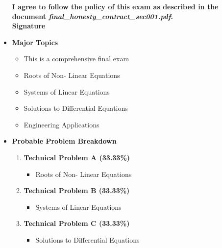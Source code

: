 \documentclass[11pt]{article}
\begin{document}
\begin{itemize}
\begin{itemize}
\end{itemize}
\begin{framed}
		 \textbf{\Large I \underline{\hspace{50mm}} agree to follow the policy of this exam as described in the document {\it final\_honesty\_contract\_sec001.pdf}.  }\vspace{3mm}\\
		 \textbf{\Large Signature \underline{\hspace{100mm} }}\\
\end{framed}
	
\newpage
\item  \textbf{\Large Major Topics}\\
	\begin{itemize}

		\item  {\large This is a comprehensive final exam}\\
		\item  {\large Roots of Non- Linear Equations }
		\item  {\large Systems of Linear Equations}
		\item  {\large Solutions to Differential Equations}
		\item  {\large Engineering Applications}
		
	\end{itemize}

\item  \textbf{\Large Probable Problem Breakdown}\\
\Large
	\begin{enumerate}


		\item  \textbf{\Large Technical Problem A (33.33\%)}
		\begin{itemize}
			\item  Roots of Non- Linear Equations \\
		\end{itemize}
		\item  \textbf{\Large Technical Problem B (33.33\%)}
		\begin{itemize}
			\item Systems of Linear Equations \\
		\end{itemize}
		\item  \textbf{\Large Technical Problem C (33.33\%)}
		\begin{itemize}
			\item Solutions to Differential Equations \\


\end{itemize}
\end{enumerate}
\end{itemize}
\end{document}
